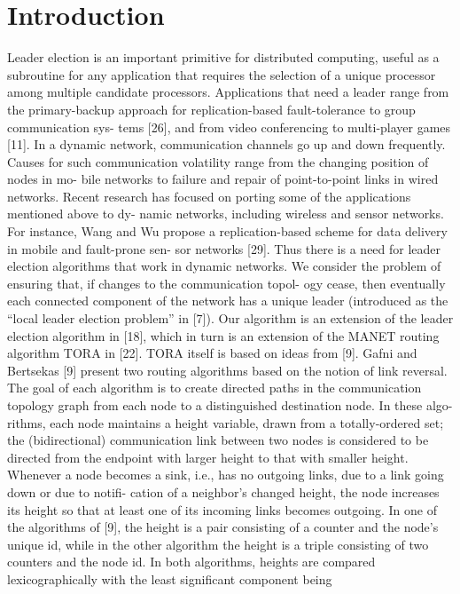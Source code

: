 \chapter{Introduction}

Leader election is an important primitive for distributed computing, useful as a subroutine for any application that requires the selection of a unique processor among multiple candidate processors. Applications that need a leader range from the primary-backup approach for replication-based fault-tolerance to group communication sys-
tems [26], and from video conferencing to multi-player games [11].
In a dynamic network, communication channels go up and down frequently. Causes
for such communication volatility range from the changing position of nodes in mo-
bile networks to failure and repair of point-to-point links in wired networks. Recent
research has focused on porting some of the applications mentioned above to dy-
namic networks, including wireless and sensor networks. For instance, Wang and Wu
propose a replication-based scheme for data delivery in mobile and fault-prone sen-
sor networks [29]. Thus there is a need for leader election algorithms that work in
dynamic networks.
We consider the problem of ensuring that, if changes to the communication topol-
ogy cease, then eventually each connected component of the network has a unique
leader (introduced as the “local leader election problem” in [7]). Our algorithm is an
extension of the leader election algorithm in [18], which in turn is an extension of the
MANET routing algorithm TORA in [22]. TORA itself is based on ideas from [9].
Gafni and Bertsekas [9] present two routing algorithms based on the notion of link
reversal. The goal of each algorithm is to create directed paths in the communication
topology graph from each node to a distinguished destination node. In these algo-
rithms, each node maintains a height variable, drawn from a totally-ordered set; the
(bidirectional) communication link between two nodes is considered to be directed
from the endpoint with larger height to that with smaller height. Whenever a node
becomes a sink, i.e., has no outgoing links, due to a link going down or due to notifi-
cation of a neighbor’s changed height, the node increases its height so that at least one
of its incoming links becomes outgoing. In one of the algorithms of [9], the height is
a pair consisting of a counter and the node’s unique id, while in the other algorithm
the height is a triple consisting of two counters and the node id. In both algorithms,
heights are compared lexicographically with the least significant component being
